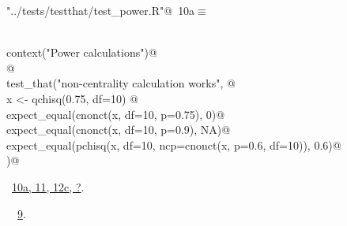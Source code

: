 \documentclass[reqno]{amsart}
\renewcommand{\NWtarget}[2]{\hypertarget{#1}{#2}}
\renewcommand{\NWlink}[2]{\hyperlink{#1}{#2}}
\begin{document}
\begin{flushleft} \small\label{scrap15}\raggedright\small
\NWtarget{nuweb10a}{} \verb@"../tests/testthat/test_power.R"@\nobreak\ {\footnotesize {10a}}$\equiv$
\vspace{-1ex}
\begin{list}{}{} \item
\mbox{}\verb@@\\
\mbox{}\verb@  context("Power calculations")@\\
\mbox{}\verb@  @\\
\mbox{}\verb@  test_that("non-centrality calculation works", {@\\
\mbox{}\verb@    x <- qchisq(0.75, df=10) @\\
\mbox{}\verb@    expect_equal(cnonct(x, df=10, p=0.75), 0)@\\
\mbox{}\verb@    expect_equal(cnonct(x, df=10, p=0.9), NA)@\\
\mbox{}\verb@    expect_equal(pchisq(x, df=10, ncp=cnonct(x, p=0.6, df=10)), 0.6)@\\
\mbox{}\verb@  })@\\
\mbox{}\verb@@{\NWsep}
\end{list}
\vspace{-1.5ex}
\footnotesize
\begin{list}{}{\setlength{\itemsep}{-\parsep}\setlength{\itemindent}{-\leftmargin}}
\item \NWtxtFileDefBy\ \NWlink{nuweb10a}{10a}\NWlink{nuweb11}{, 11}\NWlink{nuweb12c}{, 12c}\NWlink{nuweb?}{, ?}.
\item \NWtxtIdentsUsed\nobreak\  \verb@cnonct@\nobreak\ \NWlink{nuweb9}{9}.
\item{}
\end{list}
\vspace{4ex}
\end{flushleft}
\end{document}
